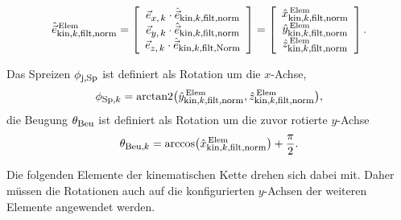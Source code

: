 \begin{equation}
    \hat{\vec{e}}_{\textrm{\footnotesize{kin,$k$,filt,norm}}}^{\,\text{Elem}} = \left[\begin{array}{c} \vec{e}_{\textrm{\footnotesize{$x,k$}}}\cdot\hat{\vec{e}}_{\textrm{\footnotesize{kin,$k$,filt,norm}}} \\ \vec{e}_{\textrm{\footnotesize{$y,k$}}}\cdot\hat{\vec{e}}_{\textrm{\footnotesize{kin,$k$,filt,norm}}} \\ \vec{e}_{\textrm{\footnotesize{$z,k$}}}\cdot\hat{\vec{e}}_{\textrm{\footnotesize{kin,$k$,filt,Norm}}} \end{array}\right] = \left[\begin{array}{c}
        \hat{x}_{\textrm{\footnotesize{kin,$k$,filt,norm}}}^{\,\text{Elem}} \\ \hat{y}_{\textrm{\footnotesize{kin,$k$,filt,norm}}}^{\,\text{Elem}} \\\hat{z}_{\textrm{\footnotesize{kin,$k$,filt,norm}}}^{\,\text{Elem}}
    \end{array}\right].
\end{equation}

Das Spreizen $\phi_{\textrm{\footnotesize{j,Sp}}}$ ist definiert als Rotation um die $x$-Achse,
\begin{equation}
    \phi_{\textrm{\footnotesize{Sp,$k$}}} = \text{arctan2}\bigl(\hat{y}_{\textrm{\footnotesize{kin,$k$,filt,norm}}}^{\,\text{Elem}},\hat{z}_{\textrm{\footnotesize{kin,$k$,filt,norm}}}^{\,\text{Elem}}\bigr),
\end{equation}
die Beugung $\theta_{\textrm{\footnotesize{Beu}}}$ ist definiert als Rotation um die zuvor rotierte $y$-Achse
\begin{equation}
    \theta_{\textrm{\footnotesize{Beu,$k$}}} = \arccos\bigl(\hat{x}_{\textrm{\footnotesize{kin,$k$,filt,norm}}}^{\,\text{Elem}}\bigr) + \frac{\pi}{2}.
\end{equation}

Die folgenden Elemente der kinematischen Kette drehen sich dabei mit. Daher müssen die Rotationen auch auf die konfigurierten $y$-Achsen der weiteren Elemente angewendet werden.

  
  
